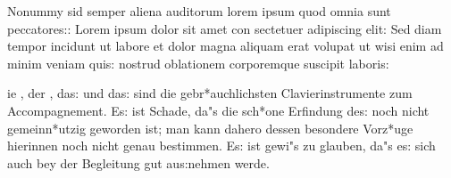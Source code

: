 \documentclass[a4paper]{article}
\begin{document}


\begin{minipage}{10cm}
\gothfamily\Large\baselineskip10pt
Nonummy sid semper aliena auditorum lorem ipsum quod omnia sunt 
peccatores:: Lorem ipsum dolor sit amet con sectetuer adipiscing elit:
Sed diam tempor incidunt ut labore et dolor magna aliquam erat volupat
ut wisi enim ad minim veniam quis: nostrud oblationem
corporemque suscipit laboris:

\end{minipage}
\vspace{2.5cm}



\begin{minipage}{14cm}
\parindent=1cm %
\frakfamily\Large\fraklines
{}ie , der ,
das:  und das:  sind die
gebr*auchlichsten Clavierinstrumente zum Accompagnement. Es: ist Schade,
da"s die sch*one Erfindung des: 
noch nicht gemeinn*utzig geworden ist; man kann dahero dessen besondere
Vorz*uge hierinnen noch nicht genau bestimmen. Es: ist gewi"s zu 
glauben, da"s es: sich auch bey der Begleitung gut aus:nehmen werde.


\end{minipage}
\vspace{2.5cm}


\end{document}
